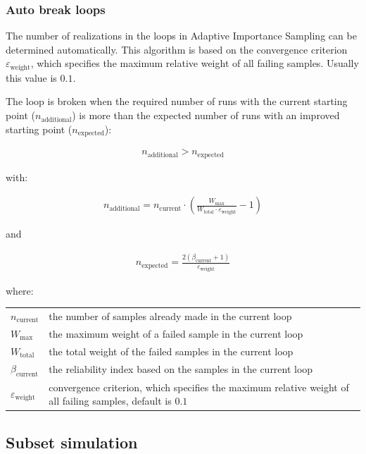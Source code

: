 {\subsubsection{Auto break loops}
\label{sec:AutoBreakLoops}

The number of realizations in the loops in Adaptive Importance Sampling can be determined automatically. This algorithm is based on the convergence criterion $\varepsilon_\text{weight}$, which specifies the maximum relative weight of all failing samples. Usually this value is $0.1$.

The loop is broken when the required number of runs with the current starting point ($n_\text{additional}$) is more than the expected number of runs with an improved starting point ($n_\text{expected}$):

\begin{align}
\label{eq:ISAutoBreak}
n_\text{additional} > n_\text{expected} 
\end{align}

with:

\begin{align}
\label{eq:ISAutoBreakAdditional}
n_\text{additional} = n_\text{current} \cdot \left(\frac{W_\text{max}}{W_\text{total} \cdot \varepsilon_\text{weight}} - 1\right)
\end{align}

and

\begin{align}
\label{eq:ISAutoBreakExpected}
n_\text{expected} = \frac{2 \left(\beta_\text{current} + 1\right)}{\varepsilon_\text{weight}}
\end{align}

where:

\begin{longtable}{p{16mm}p{\textwidth-24pt-16mm}}  
	$n_\text{current}$ & the number of samples already made in the current loop \\
	$W_\text{max}$ & the maximum weight of a failed sample in the current loop \\
	$W_\text{total}$ & the total weight of the failed samples in the current loop \\
	$\beta_\text{current}$ & the reliability index based on the samples in the current loop \\
	$\varepsilon_\text{weight}$ & convergence criterion,
	which specifies the maximum relative weight of all failing samples, default is $0.1$
\end{longtable}


\subsection{Subset simulation}
\label{sec:SubsetSimulation}

}
